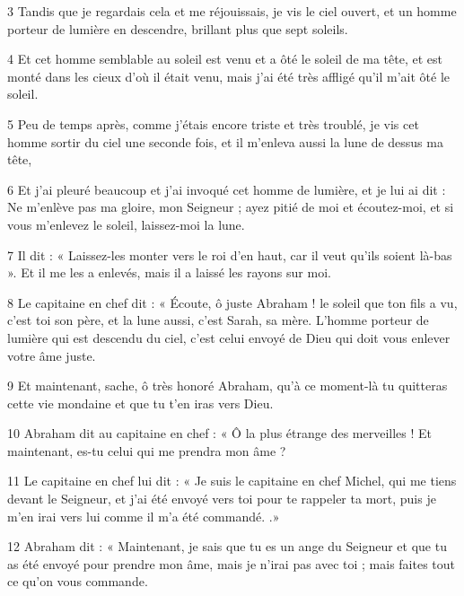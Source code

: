 \par 3 Tandis que je regardais cela et me réjouissais, je vis le ciel ouvert, et un homme porteur de lumière en descendre, brillant plus que sept soleils.

\par 4 Et cet homme semblable au soleil est venu et a ôté le soleil de ma tête, et est monté dans les cieux d'où il était venu, mais j'ai été très affligé qu'il m'ait ôté le soleil.

\par 5 Peu de temps après, comme j'étais encore triste et très troublé, je vis cet homme sortir du ciel une seconde fois, et il m'enleva aussi la lune de dessus ma tête,

\par 6 Et j'ai pleuré beaucoup et j'ai invoqué cet homme de lumière, et je lui ai dit : Ne m'enlève pas ma gloire, mon Seigneur ; ayez pitié de moi et écoutez-moi, et si vous m'enlevez le soleil, laissez-moi la lune.

\par 7 Il dit : « Laissez-les monter vers le roi d'en haut, car il veut qu'ils soient là-bas ». Et il me les a enlevés, mais il a laissé les rayons sur moi.

\par 8 Le capitaine en chef dit : « Écoute, ô juste Abraham ! le soleil que ton fils a vu, c'est toi son père, et la lune aussi, c'est Sarah, sa mère. L’homme porteur de lumière qui est descendu du ciel, c’est celui envoyé de Dieu qui doit vous enlever votre âme juste.

\par 9 Et maintenant, sache, ô très honoré Abraham, qu'à ce moment-là tu quitteras cette vie mondaine et que tu t'en iras vers Dieu.

\par 10 Abraham dit au capitaine en chef : « Ô la plus étrange des merveilles ! Et maintenant, es-tu celui qui me prendra mon âme ?

\par 11 Le capitaine en chef lui dit : « Je suis le capitaine en chef Michel, qui me tiens devant le Seigneur, et j'ai été envoyé vers toi pour te rappeler ta mort, puis je m'en irai vers lui comme il m'a été commandé. .»

\par 12 Abraham dit : « Maintenant, je sais que tu es un ange du Seigneur et que tu as été envoyé pour prendre mon âme, mais je n'irai pas avec toi ; mais faites tout ce qu’on vous commande.

